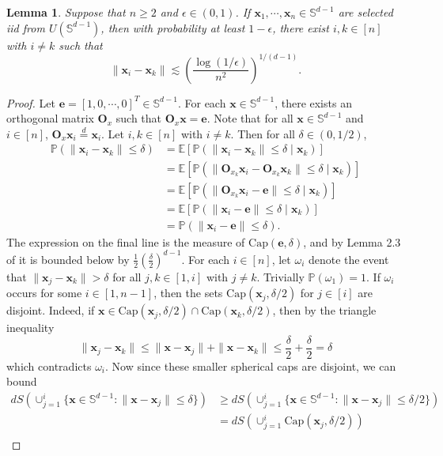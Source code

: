 \documentclass{article}
\newtheorem{lemma}[theorem]{Lemma}
\theoremstyle{definition}
\renewcommand{\P}{\mathbb{P}}
\newcommand{\E}{\mathbb{E}}
\renewcommand{\S}{\mathbb{S}}
\def\ve{{\bm{e}}}
\def\vx{{\bm{x}}}
\def\mO{{\bm{O}}}
\begin{document}
\begin{lemma}\label{lemma:sphere-antiseparation}
    Suppose that $n \geq 2$ and $\epsilon \in (0, 1)$. If $\vx_1, \cdots, \vx_n \in \S^{d - 1}$ are selected iid from $U(\S^{d - 1})$, then with probability at least $1 - \epsilon$, there exist $i, k \in [n]$ with $i \neq k$ such that
    \[\|\vx_i - \vx_k\|  \lesssim \left(\frac{\log(1/\epsilon) }{n^2} \right)^{1/(d - 1) }.  \]
\end{lemma}
\begin{proof}
    Let $\ve = [1, 0, \cdots, 0]^T \in \S^{d - 1}$. For each $\vx \in \S^{d - 1}$, there exists an orthogonal matrix $\mO_x$ such that $\mO_x \vx = \ve$. Note that for all $\vx \in \S^{d - 1}$ and $i \in [n]$, $\mO_x \vx_i \stackrel{d}{=} \vx_i$. Let $i, k \in [n]$ with $i \neq k$. Then for all $\delta \in (0, 1/2)$,
    \begin{align*}
        \P(\|\vx_i - \vx_k\| \leq \delta) &= \E[\P(\|\vx_i - \vx_k\| \leq \delta \mid \vx_k) ]\\
        &= \E[\P(\|\mO_{x_k}\vx_i - \mO_{x_k}\vx_k\| \leq \delta \mid \vx_k) ]\\
        &= \E[\P(\|\mO_{x_k}\vx_i - \ve\| \leq \delta \mid \vx_k) ]\\
        &= \E[\P(\|\vx_i - \ve\| \leq \delta \mid \vx_k) ]\\
        &= \P(\|\vx_i - \ve\| \leq \delta).
    \end{align*}
    The expression on the final line is the measure of $\text{Cap}(\ve, \delta)$, and by Lemma 2.3 of \cite{ball1997elementary} it is bounded below by $\frac{1}{2}\left(\frac{\delta}{2}\right)^{d - 1}$. For each $i \in [n]$, let $\omega_i$ denote the event that $\|\vx_j - \vx_k\| > \delta$ for all $j, k \in [1, i]$ with $j \neq k$. Trivially $\P(\omega_1) = 1$. If $\omega_i$ occurs for some $i \in [1, n - 1]$, then the sets $\text{Cap}(\vx_j, \delta/2)$ for $j \in [i]$ are disjoint. Indeed, if $\vx \in \text{Cap}(\vx_j, \delta/2) \cap \text{Cap}(\vx_k, \delta/2)$, then by the triangle inequality
    \[\|\vx_j - \vx_k\| \leq \|\vx - \vx_j\| + \|\vx - \vx_k\| \leq \frac{\delta}{2} + \frac{\delta}{2} = \delta \]
    which contradicts $\omega_i$. Now since these smaller spherical caps are disjoint, we can bound
    \begin{align*}
        dS\left(\cup_{j = 1}^i\{\vx \in \S^{d - 1}: \|\vx - \vx_j\| \leq \delta \}\right) &\geq dS\left(\cup_{j = 1}^i\{\vx \in \S^{d - 1}: \|\vx - \vx_j\| \leq \delta/2 \}\right)\\
        &= dS\left(\cup_{j = 1}^i \text{Cap}(\vx_j, \delta/2)\right)\\

\end{align*}
\end{proof}
\end{document}
